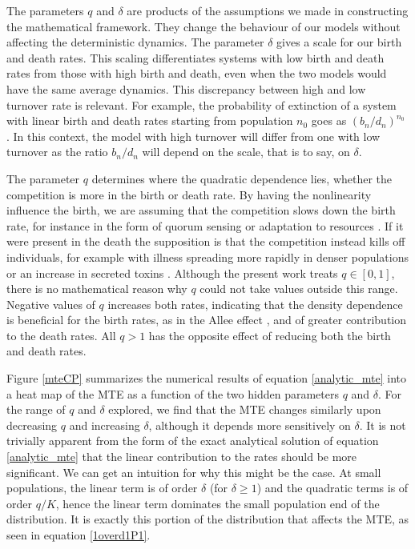 The parameters $q$ and $\delta$ are products of the assumptions we made in constructing the mathematical framework.
They change the behaviour of our models without affecting the deterministic dynamics.
The parameter $\delta$ gives a scale for our birth and death rates.
This scaling differentiates systems with low birth and death rates from those with high birth and death, even when the two models would have the same average dynamics.
This discrepancy between high and low turnover rate is relevant. 
For example, the probability of extinction of a system with linear birth and death rates starting from population $n_0$ goes as $(b_n/d_n)^{n_0}$ \cite{Nisbet1982}. 
In this context, the model with high turnover will differ from one with low turnover as the ratio $b_n/d_n$ will depend on the scale, that is to say, on $\delta$.

The parameter $q$ determines where the quadratic dependence lies, whether the competition is more in the birth or death rate.
By having the nonlinearity influence the birth, we are assuming that the competition slows down the birth rate, for instance in the form of quorum sensing \cite{Nadell2008} or adaptation to resources \cite{Vulic2001}. %
If it were present in the death the supposition is that the competition instead kills off individuals, for example with illness spreading more rapidly in denser populations \cite{Greenhalgh1990} or an increase in secreted toxins \cite{VanMelderen2009,Rankin2012}.
Although the present work treats $q \in [0,1]$, there is no mathematical reason why $q$ could not take values outside this range.
Negative values of $q$ increases both rates, indicating that the density dependence is beneficial for the birth rates, as in the Allee effect \cite{Chesson2000,Assaf2016}, and of greater contribution to the death rates.
All $q>1$ has the opposite effect of reducing both the birth and death rates. %

Figure \ref{mteCP} summarizes the numerical results of equation \ref{analytic_mte} into a heat map of the MTE as a function of the two hidden parameters $q$ and $\delta$.
For the range of $q$ and $\delta$ explored, we find that the MTE changes similarly upon decreasing $q$ and increasing $\delta$, although it depends more sensitively on $\delta$.
It is not trivially apparent from the form of the exact analytical solution of equation \ref{analytic_mte} that the linear contribution to the rates should be more significant.
We can get an intuition for why this might be the case.
At small populations, the linear term is of order $\delta$ (for $\delta \geq 1$) and the quadratic terms is of order $q/K$, hence the linear term dominates the small population end of the distribution.
It is exactly this portion of the distribution that affects the MTE, as seen in equation \ref{1overd1P1}.

